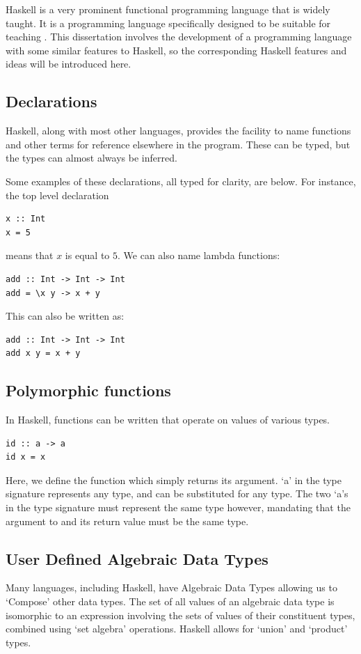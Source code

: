 Haskell is a very prominent functional programming language that is widely taught. It is a programming language specifically designed to be suitable for teaching \cite{hudak2007history}. This dissertation involves the development of a programming language with some similar features to Haskell, so the corresponding Haskell features and ideas will be introduced here. 

\subsection{Declarations}
Haskell, along with most other languages, provides the facility to name functions and other terms for reference elsewhere in the program. These can be typed, but the types can almost always be inferred. 

Some examples of these declarations, all typed for clarity, are below. For instance, the top level declaration
\begin{lstlisting}[language=SFL]
x :: Int
x = 5
\end{lstlisting}
means that $x$ is equal to $5$. We can also name lambda functions:
\begin{lstlisting}[language=SFL]
add :: Int -> Int -> Int
add = \x y -> x + y
\end{lstlisting}
This can also be written as:
\begin{lstlisting}[language=SFL]
add :: Int -> Int -> Int
add x y = x + y
\end{lstlisting}
\subsection{Polymorphic functions}
In Haskell, functions can be written that operate on values of various types. 

\begin{lstlisting}[language=SFL]
id :: a -> a
id x = x
\end{lstlisting}
\noindent Here, we define the function  which simply returns its argument. `a' in the type signature represents any type, and can be substituted for any type. The two `a's in the type signature must represent the same type however, mandating that the argument to  and its return value must be the same type.  

\subsection{User Defined Algebraic Data Types}
\label{bg:haskell_udt}
Many languages, including Haskell, have Algebraic Data Types allowing us to `Compose' other data types. The set of all values of an algebraic data type is isomorphic to an expression involving the sets of values of their constituent types, combined using `set algebra' operations. Haskell allows for `union' and `product' types.  

